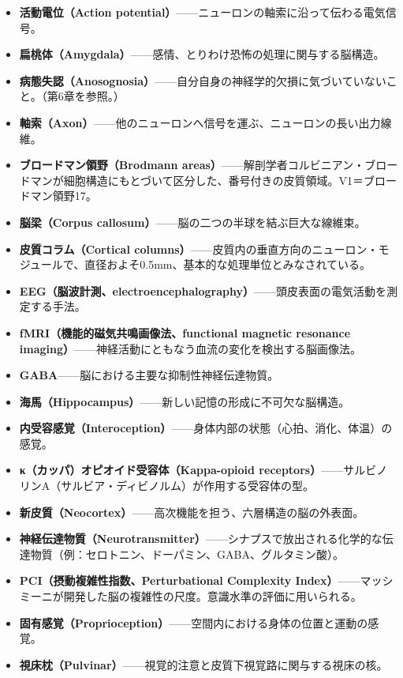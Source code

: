 \documentclass[11pt, twoside, openright]{book}
\begin{document}
\begin{itemize}
  \item \textbf{活動電位（Action potential）}------ニューロンの軸索に沿って伝わる電気信号。
  \item \textbf{扁桃体（Amygdala）}------感情、とりわけ恐怖の処理に関与する脳構造。
  \item \textbf{病態失認（Anosognosia）}------自分自身の神経学的欠損に気づいていないこと。（第6章を参照。）
  \item \textbf{軸索（Axon）}------他のニューロンへ信号を運ぶ、ニューロンの長い出力線維。
  \item \textbf{ブロードマン領野（Brodmann areas）}------解剖学者コルビニアン・ブロードマンが細胞構造にもとづいて区分した、番号付きの皮質領域。V1＝ブロードマン領野17。
  \item \textbf{脳梁（Corpus callosum）}------脳の二つの半球を結ぶ巨大な線維束。
  \item \textbf{皮質コラム（Cortical columns）}------皮質内の垂直方向のニューロン・モジュールで、直径およそ0.5mm、基本的な処理単位とみなされている。
  \item \textbf{EEG（脳波計測、electroencephalography）}------頭皮表面の電気活動を測定する手法。
  \item \textbf{fMRI（機能的磁気共鳴画像法、functional magnetic resonance imaging）}------神経活動にともなう血流の変化を検出する脳画像法。
  \item \textbf{GABA}------脳における主要な抑制性神経伝達物質。
  \item \textbf{海馬（Hippocampus）}------新しい記憶の形成に不可欠な脳構造。
  \item \textbf{内受容感覚（Interoception）}------身体内部の状態（心拍、消化、体温）の感覚。
  \item \textbf{κ（カッパ）オピオイド受容体（Kappa-opioid receptors）}------サルビノリンA（サルビア・ディビノルム）が作用する受容体の型。
  \item \textbf{新皮質（Neocortex）}------高次機能を担う、六層構造の脳の外表面。
  \item \textbf{神経伝達物質（Neurotransmitter）}------シナプスで放出される化学的な伝達物質（例：セロトニン、ドーパミン、GABA、グルタミン酸）。
  \item \textbf{PCI（摂動複雑性指数、Perturbational Complexity Index）}------マッシミーニが開発した脳の複雑性の尺度。意識水準の評価に用いられる。
  \item \textbf{固有感覚（Proprioception）}------空間内における身体の位置と運動の感覚。
  \item \textbf{視床枕（Pulvinar）}------視覚的注意と皮質下視覚路に関与する視床の核。

\end{itemize}
\end{document}
